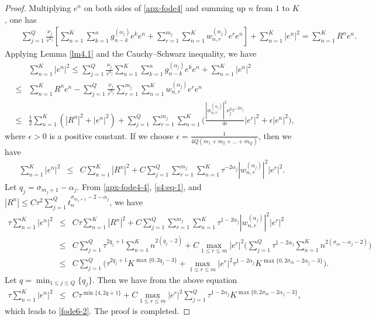 \documentclass[10pt]{siamltex}
\begin{document}
\begin{proof}
Multiplying $e^n$ on both sides of \eqref{apx-fode4} and summing up $n$ from $1$ to $K$, one has
\begin{eqnarray}
&&\sum_{j=1}^Q\frac{\nu_j}{\tau^{\alpha_j}}\left[\sum_{n=1}^K\sum_{k=1}^ng^{(\alpha_j)}_{n-k}e^ke^n
+\sum_{r=1}^{m_j}\sum_{n=1}^Kw^{(\alpha_j)}_{n,r}e^re^n\right] + \sum_{n=1}^K|e^n|^2
=\sum_{n=1}^KR^ne^n.\label{apx-fode4-2}
\end{eqnarray}
Applying Lemma \ref{lm4.1} and  the Cauchy--Schwarz inequality, we have
\begin{eqnarray}
&&\sum_{n=1}^K|e^n|^2
\leq\sum_{j=1}^Q\frac{\nu_j}{\tau^{\alpha_j}}\sum_{n=1}^K\sum_{k=1}^ng^{(\alpha_j)}_{n-k}e^ke^n
 + \sum_{n=1}^K|e^n|^2\nonumber\\
&\leq&\sum_{n=1}^KR^ne^n-\sum_{j=1}^Q\frac{\nu_j}{\tau^{\alpha_j}} \sum_{r=1}^{m_j}\sum_{n=1}^Kw^{(\alpha_j)}_{n,r}e^re^n\nonumber\\
&\leq&\frac{1}{2}\sum_{n=1}^K(|R^n|^2+|e^n|^2)+
\sum_{j=1}^Q \sum_{r=1}^{m_j}\sum_{n=1}^K
\bigg(\frac{|w^{(\alpha_j)}_{n,r}|^2\nu_j^2\tau^{-2\alpha_j}}{4\epsilon}
|e^r|^2+\epsilon|e^n|^2\bigg),\label{apx-fode4-3}
\end{eqnarray}
where $\epsilon>0$ is a positive constant. If we choose $\epsilon=\frac{1}{4Q(m_1+m_2+...+m_Q)}$,
then we have
\begin{eqnarray}
\sum_{n=1}^K|e^n|^2
&\leq&C\sum_{n=1}^K|R^n|^2+C\sum_{j=1}^Q \sum_{r=1}^{m_j}
\sum_{n=1}^K{\tau^{-2\alpha_j}|w^{(\alpha_j)}_{n,r}|^2}|e^r|^2.\label{apx-fode4-4}
\end{eqnarray}
Let $q_j=\sigma_{m_j+1}-\alpha_j$. From \eqref{apx-fode4-4}, \eqref{s4:eq-1}, and
$|R^n|\leq C\tau^2\sum_{j=1}^Qt_{n}^{\sigma_{m_j+1}-2-\alpha_j}$, we have
\begin{eqnarray}
\tau\sum_{n=1}^K|e^n|^2
&\leq& C\tau\sum_{n=1}^K|R^n|^2+C\sum_{j=1}^Q \sum_{r=1}^{m_j}
\sum_{n=1}^K{\tau^{1-2\alpha_j}|w^{(\alpha_j)}_{n,r}|^2}|e^r|^2\nonumber\\
&\leq&C\sum_{j=1}^Q\tau^{2q_j+1}\sum_{n=1}^Kn^{2(q_j-2)}
+C\max_{1\leq r \leq m}|e^r|^2
\bigg(\sum_{j=1}^Q\tau^{1-2\alpha_j}\sum_{n=1}^Kn^{{2(\sigma_m-\alpha_j-2)}}\bigg)\nonumber\\
&\leq&C\sum_{j=1}^Q\bigg(\tau^{2q_j+1}K^{\max\{0,2q_j-3\}}
+\max_{1\leq r \leq m}|e^r|^2\tau^{1-2\alpha_j}K^{\max\{0,2\sigma_m-2\alpha_j-3\}}\bigg).\nonumber
\label{apx-fode4-5}
\end{eqnarray}
Let $q=\min_{1\leq j\leq Q}\{q_j\}$.  Then we have from the above equation
\begin{eqnarray}
\tau\sum_{n=1}^K|e^n|^2
&\leq&C\tau^{\min\{4,2q+1\}}
+C\max_{1\leq r \leq m}|e^r|^2
\sum_{j=1}^Q\tau^{1-2\alpha_j}K^{\max\{0,2\sigma_m-2\alpha_j-3\}},
\nonumber
\end{eqnarray}
which leads to \eqref{fode6-2}. The proof is completed.
\end{proof}
\end{document}
